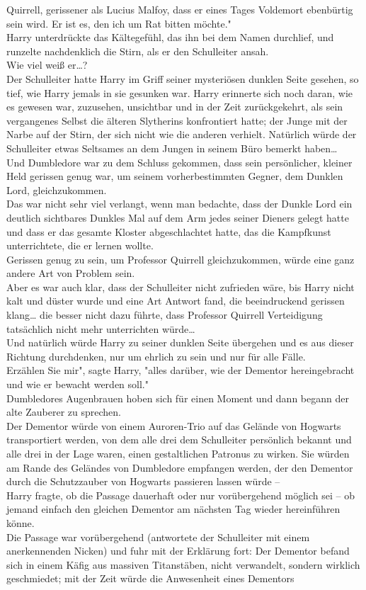{Quirrell, gerissener als Lucius Malfoy, dass er eines Tages Voldemort ebenbürtig sein wird. Er ist es, den ich um Rat bitten möchte."\\ Harry unterdrückte das Kältegefühl, das ihn bei dem Namen durchlief, und runzelte nachdenklich die Stirn, als er den Schulleiter ansah.\\ Wie viel weiß er…?\\ Der Schulleiter hatte Harry im Griff seiner mysteriösen dunklen Seite gesehen, so tief, wie Harry jemals in sie gesunken war. Harry erinnerte sich noch daran, wie es gewesen war, zuzusehen, unsichtbar und in der Zeit zurückgekehrt, als sein vergangenes Selbst die älteren Slytherins konfrontiert hatte; der Junge mit der Narbe auf der Stirn, der sich nicht wie die anderen verhielt. Natürlich würde der Schulleiter etwas Seltsames an dem Jungen in seinem Büro bemerkt haben…\\ Und Dumbledore war zu dem Schluss gekommen, dass sein persönlicher, kleiner Held gerissen genug war, um seinem vorherbestimmten Gegner, dem Dunklen Lord, gleichzukommen.\\ Das war nicht sehr viel verlangt, wenn man bedachte, dass der Dunkle Lord ein deutlich sichtbares Dunkles Mal auf dem Arm jedes seiner Dieners gelegt hatte und dass er das gesamte Kloster abgeschlachtet hatte, das die Kampfkunst unterrichtete, die er lernen wollte.\\ Gerissen genug zu sein, um Professor Quirrell gleichzukommen, würde eine ganz andere Art von Problem sein.\\ Aber es war auch klar, dass der Schulleiter nicht zufrieden wäre, bis Harry nicht kalt und düster wurde und eine Art Antwort fand, die beeindruckend gerissen klang… die besser nicht dazu führte, dass Professor Quirrell Verteidigung tatsächlich nicht mehr unterrichten würde…\\ Und natürlich würde Harry zu seiner dunklen Seite übergehen und es aus dieser Richtung durchdenken, nur um ehrlich zu sein und nur für alle Fälle.\\ Erzählen Sie mir", sagte Harry, "alles darüber, wie der Dementor hereingebracht und wie er bewacht werden soll."\\ Dumbledores Augenbrauen hoben sich für einen Moment und dann begann der alte Zauberer zu sprechen.\\ Der Dementor würde von einem Auroren-Trio auf das Gelände von Hogwarts transportiert werden, von dem alle drei dem Schulleiter persönlich bekannt und alle drei in der Lage waren, einen gestaltlichen Patronus zu wirken. Sie würden am Rande des Geländes von Dumbledore empfangen werden, der den Dementor durch die Schutzzauber von Hogwarts passieren lassen würde --\\ Harry fragte, ob die Passage dauerhaft oder nur vorübergehend möglich sei -- ob jemand einfach den gleichen Dementor am nächsten Tag wieder hereinführen könne.\\ Die Passage war vorübergehend (antwortete der Schulleiter mit einem anerkennenden Nicken) und fuhr mit der Erklärung fort: Der Dementor befand sich in einem Käfig aus massiven Titanstäben, nicht verwandelt, sondern wirklich geschmiedet; mit der Zeit würde die Anwesenheit eines Dementors }
